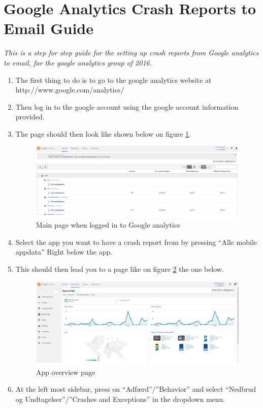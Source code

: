 \section{Google Analytics Crash Reports to Email Guide} \label{ChapCrashReport}
\textit{This is a step for step guide for the setting up crash reports from Google analytics to email, for the google analytics group of 2016.}

\begin{enumerate}
	\item The first thing to do is to go to the google analytics website at http://www.google.com/analytics/ 
	\item Then log in to the google account using the google account information provided.
	\item The page should then look like shown below on figure \ref{MainPage}.
		\begin{figure}[H]
			\includegraphics[width=0.8 \textwidth]{pictures/MainPage.png}
			\caption{Main page when logged in to Google analytics}
			\label{MainPage}
		\end{figure}
	\item Select the app you want to have a crash report from by pressing “Alle mobile appdata” Right below the app.
	\item This should then lead you to a page like on figure \ref{Appoversigt} the one below.
		\begin{figure}[H]
			\includegraphics[width=0.8 \textwidth]{pictures/Appoversigt.png}
			\caption{App overview page}
			\label{Appoversigt}
		\end{figure}
	\item At the left most sidebar, press on “Adfærd”/”Behavior” and select “Nedbrud og Undtagelser”/”Crashes and Exceptions” in the dropdown menu.

\end{enumerate}
